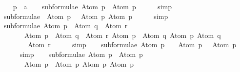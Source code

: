 \begin{isabellebody}
\begin{isamarkuptext}
\end{isamarkuptext}\isamarkuptrue%
\isamarkupfalse%
\isanewline
{}\isanewline
%
\isadelimproof
\ \ %
\endisadelimproof
%
\isatagproof
{}\isamarkupfalse%
\ p\ {\isacharcolon}{\isacharcolon}\ {\isacharprime}a\isanewline
\isanewline
\ \ \isamarkupfalse%
\ {\isachardoublequoteopen}subformulae\ {\isacharparenleft}Atom\ p{\isacharparenright}\ {\isacharequal}\ {\isacharbrackleft}Atom\ p{\isacharbrackright}{\isachardoublequoteclose}\isanewline
\ \ \ \ \isamarkupfalse%
\ simp\isanewline
\isanewline
\ \ \isamarkupfalse%
\ {\isachardoublequoteopen}subformulae\ {\isacharparenleft}\isactrlbold {\isasymnot}\ {\isacharparenleft}Atom\ p{\isacharparenright}{\isacharparenright}\ {\isacharequal}\ {\isacharbrackleft}\isactrlbold {\isasymnot}\ {\isacharparenleft}Atom\ p{\isacharparenright}{\isacharcomma}\ Atom\ p{\isacharbrackright}{\isachardoublequoteclose}\isanewline
\ \ \ \ \isamarkupfalse%
\ simp\isanewline
\isanewline
\ \ \isamarkupfalse%
\ {\isachardoublequoteopen}subformulae\ {\isacharparenleft}{\isacharparenleft}Atom\ p\ \isactrlbold {\isasymrightarrow}\ Atom\ q{\isacharparenright}\ \isactrlbold {\isasymor}\ Atom\ r{\isacharparenright}\ {\isacharequal}\ \isanewline
\ \ \ \ \ \ \ {\isacharbrackleft}{\isacharparenleft}Atom\ p\ \isactrlbold {\isasymrightarrow}\ Atom\ q{\isacharparenright}\ \isactrlbold {\isasymor}\ Atom\ r{\isacharcomma}\ Atom\ p\ \isactrlbold {\isasymrightarrow}\ Atom\ q{\isacharcomma}\ Atom\ p{\isacharcomma}\ Atom\ q{\isacharcomma}\ \isanewline
\ \ \ \ \ \ \ \ Atom\ r{\isacharbrackright}{\isachardoublequoteclose}\isanewline
\ \ \ \ \isamarkupfalse%
\ simp\isanewline
\isanewline
\ \ \isamarkupfalse%
\ {\isachardoublequoteopen}subformulae\ {\isacharparenleft}Atom\ p\ \isactrlbold {\isasymand}\ {\isasymbottom}{\isacharparenright}\ {\isacharequal}\ {\isacharbrackleft}Atom\ p\ \isactrlbold {\isasymand}\ {\isasymbottom}{\isacharcomma}\ Atom\ p{\isacharcomma}\ {\isasymbottom}{\isacharbrackright}{\isachardoublequoteclose}\isanewline
\ \ \ \ \isamarkupfalse%
\ simp\isanewline
\isanewline
\ \ \isamarkupfalse%
\ {\isachardoublequoteopen}subformulae\ {\isacharparenleft}Atom\ p\ \isactrlbold {\isasymor}\ Atom\ p{\isacharparenright}\ {\isacharequal}\ \isanewline
\ \ \ \ \ \ \ {\isacharbrackleft}Atom\ p\ \isactrlbold {\isasymor}\ Atom\ p{\isacharcomma}\ Atom\ p{\isacharcomma}\ Atom\ p{\isacharbrackright}{\isachardoublequoteclose}\isanewline

\end{isabellebody}
